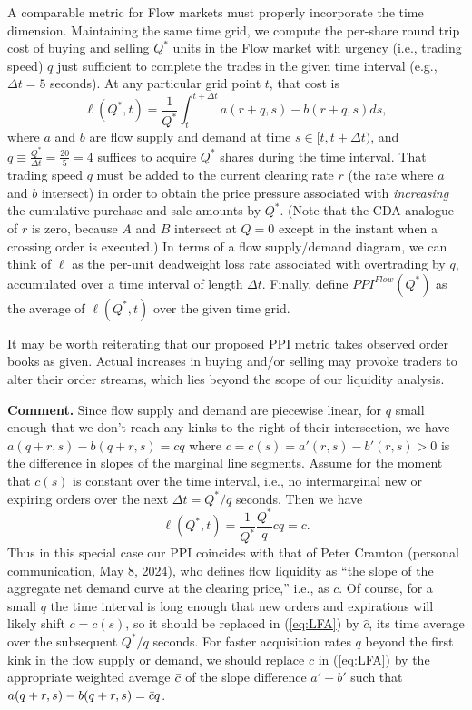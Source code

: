 \documentclass[12pt]{article}
\begin{document}
\begin{singlespace}
A comparable metric for Flow markets must properly incorporate the time dimension.
Maintaining the same time grid, we compute the per-share
round trip cost of buying and selling $Q^*$ units in the Flow market with urgency (i.e., trading speed) $q$ just sufficient to complete the trades in the given time interval (e.g., $\Delta t = 5$ seconds).
At any particular grid point $t$, that cost is
\begin{equation} \label{eq:ppiflow}
  \ell (Q^*,t) = \frac{1}{Q^*}\int_t^{t+\Delta t} a(r+q,s) - b(r+q,s) ds,
\end{equation}
where $a$ and $b$ are flow supply and demand at time $s \in [t, t+\Delta t)$, and
$q \equiv \frac{Q^*}{\Delta t}=\frac{20}{5}=4$
suffices to acquire $Q^*$ shares during the time interval.
That trading speed $q$ must be added to the current clearing rate $r$ (the rate where $a$ and $b$ intersect) in order to obtain the price pressure associated with \textit{increasing} the cumulative purchase and sale amounts by $Q^*$.
(Note that the CDA analogue of $r$ is zero, because $A$ and $B$ intersect at $Q=0$ except in the instant when a crossing order is executed.)
In terms of a flow supply/demand diagram, we can think of $\ell$ as the per-unit deadweight loss rate associated with overtrading by $q$, accumulated over a time interval of length $\Delta t.$
Finally, define
$PPI^{Flow}(Q^*)$ as the average of $\ell(Q^*,t)$ over the given time grid.

It may be worth reiterating that our proposed PPI metric takes observed order books as given. Actual increases in buying and/or selling may provoke traders to alter their order streams, which lies beyond the scope of our liquidity analysis.

\noindent
\textbf{Comment.} Since flow supply and demand are piecewise linear, for $q$ small enough that we don't reach any kinks to the right of their intersection, we have
$a(q+r,s)-b(q+r,s) = cq$ where  $c=c(s) = a'(r,s) - b'(r,s)>0$
is the difference in slopes of the marginal line segments.
Assume for the moment that $c(s)$ is constant over the time interval, i.e., no intermarginal new or expiring orders over the next $\Delta t =Q^*/q$ seconds.
Then we have
\begin{equation}\label{eq:LFA}
\ell (Q^*,t)=  \frac{1}{Q^*}\frac{Q^*}{q}cq = c.
\end{equation}
Thus in this special case our PPI coincides with that of Peter Cramton (personal communication, May 8, 2024), who
defines flow liquidity as ``the slope of the aggregate net demand curve at the clearing price,'' i.e., as $c.$
Of course, for a small $q$ the time interval is long enough that new orders and expirations will likely shift $c=c(s)$, so it should be replaced in (\ref{eq:LFA}) by $\hat{c}$, its time average  over the subsequent
$Q^*/q$ seconds.
For faster acquisition rates $q$
beyond the first kink in the flow supply or demand,
we should replace $\hat{c}$ in
(\ref{eq:LFA}) by the appropriate weighted average $\Bar{c}$ of the slope difference $a' - b'$
such that $a(q+r,s) - b(q+r,s) = \Bar{c} q $.


\end{singlespace}
\end{document}
